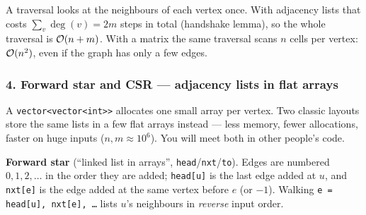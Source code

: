 \begin{diagrambox}
\end{diagrambox}

\begin{insightbox}
A traversal looks at the neighbours of each vertex once. With adjacency lists that costs $\sum_v \deg(v) = 2m$ steps in total (handshake lemma), so the whole traversal is $\mathcal{O}(n+m)$. With a matrix the same traversal scans $n$ cells per vertex: $\mathcal{O}(n^2)$, even if the graph has only a few edges.
\end{insightbox}

\subsubsection*{4. Forward star and CSR --- adjacency lists in flat arrays}

A \texttt{vector<vector<int>>} allocates one small array per vertex. Two classic layouts store the same lists in a few flat arrays instead --- less memory, fewer allocations, faster on huge inputs ($n,m\approx 10^6$). You will meet both in other people's code.

\textbf{Forward star} (``linked list in arrays'', \texttt{head}/\texttt{nxt}/\texttt{to}). Edges are numbered $0,1,2,\dots$ in the order they are added; \texttt{head[u]} is the last edge added at $u$, and \texttt{nxt[e]} is the edge added at the same vertex before $e$ (or $-1$). Walking \texttt{e = head[u], nxt[e], \ldots} lists $u$'s neighbours in \emph{reverse} input order.

